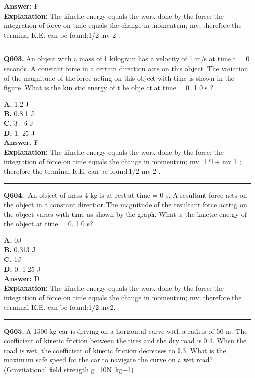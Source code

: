 \documentclass[12pt]{article}
\begin{document}
\textbf{Answer:} F \\
\textbf{Explanation:} The kinetic energy equals the work done by the force; the integration of force on time equals the change in momentum; mv; therefore the terminal K.E. can be found:1/2 mv
2
.

\hrule
\vspace{1em}


\noindent
\textbf{Q603.} An object with a mass of 1 kilogram has a velocity of 1 m/s at time t = 0 seconds. A constant force in a certain direction acts on this object. The variation of the magnitude
of the force acting on this object with time is shown in the figure.
What is the
kin
etic energy of t
he obje
ct at
time =
0.
1
0 s
?



\textbf{A.} 1.2
J \\
\textbf{B.} 0.8
1
J \\
\textbf{C.} 3
.
6
J \\
\textbf{D.} 1.
25
J \\

\textbf{Answer:} F \\
\textbf{Explanation:} The kinetic energy equals the work done by the force; the integration of force on time equals the change in momentum;
mv=1*1+
mv
1
; therefore the terminal K.E. can be found:1/2 mv
2
.

\hrule
\vspace{1em}


\noindent
\textbf{Q604.} .An object of mass
4
kg is at rest at time = 0 s. A resultant force acts on the object in a constant direction.The magnitude of the resultant force acting on the object varies with time as shown by
the graph.
What is the kinetic energy of the object at time = 0.
1
0 s?



\textbf{A.} 0J \\
\textbf{B.} 0.313
J \\
\textbf{C.} 1J \\
\textbf{D.} 0.
1
25
J \\

\textbf{Answer:} D \\
\textbf{Explanation:} The kinetic energy equals the work done by the force; the integration of force on time equals the change in momentum; mv; therefore the terminal K.E. can be found:1/2 mv2.

\hrule
\vspace{1em}


\noindent
\textbf{Q605.} A 1500 kg car is driving on a horizontal curve with a radius of 50 m. The coefficient of kinetic friction between the tires and the dry road is 0.4. When the road is wet, the coefficient of kinetic friction decreases to 0.3. What is the maximum safe speed for the car to navigate the curve on a wet road? (Gravitational field strength g=10N kg−1)
\end{document}
